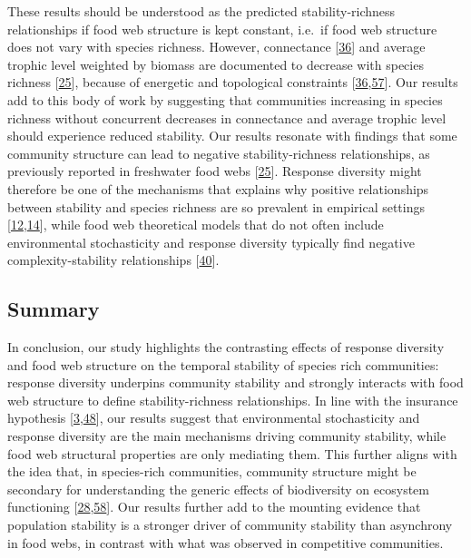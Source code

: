 \documentclass[
]{article}
\begin{document}
These results should be understood as the predicted stability-richness
relationships if food web structure is kept constant, i.e.~if food web
structure does not vary with species richness. However, connectance
{[}\protect\hyperlink{ref-dunne_network_2006}{36}{]} and average trophic level weighted by biomass are
documented to decrease with species richness {[}\protect\hyperlink{ref-danet_species_2021}{25}{]}, because of
energetic and topological constraints {[}\protect\hyperlink{ref-dunne_network_2006}{36},\protect\hyperlink{ref-gravel_trophic_2011}{57}{]}. Our results add to this body of work by suggesting that
communities increasing in species richness without concurrent decreases in
connectance and average trophic level should experience reduced stability. Our
results resonate with findings that some community structure can lead to
negative stability-richness relationships, as previously reported in freshwater
food webs {[}\protect\hyperlink{ref-danet_species_2021}{25}{]}. Response diversity might therefore be one of
the mechanisms that explains why positive relationships between stability and
species richness are so prevalent in empirical settings
{[}\protect\hyperlink{ref-thibaut_understanding_2013}{12},\protect\hyperlink{ref-elmqvist_response_2003}{14}{]}, while food web
theoretical models that do not often include environmental stochasticity and
response diversity typically find negative complexity-stability relationships
{[}\protect\hyperlink{ref-ives_stability_2007}{40}{]}.

\hypertarget{summary}{%
\subsection{Summary}\label{summary}}

In conclusion, our study highlights the contrasting effects of response
diversity and food web structure on the temporal stability of species rich
communities: response diversity underpins community stability and strongly
interacts with food web structure to define stability-richness relationships.
In line with the insurance hypothesis {[}\protect\hyperlink{ref-yachi_biodiversity_1999}{3},\protect\hyperlink{ref-loreau_biodiversity_2021}{48}{]}, our results suggest that environmental
stochasticity and response diversity are the main mechanisms driving community
stability, while food web structural properties are only mediating them. This
further aligns with the idea that, in species-rich communities, community
structure might be secondary for understanding the generic effects of
biodiversity on ecosystem functioning {[}\protect\hyperlink{ref-ives_stability_2000}{28},\protect\hyperlink{ref-barbier_generic_2018}{58}{]}. Our results further add to the mounting evidence that
population stability is a stronger driver of community stability than
asynchrony in food webs, in contrast with what was observed in competitive
communities.
\end{document}
